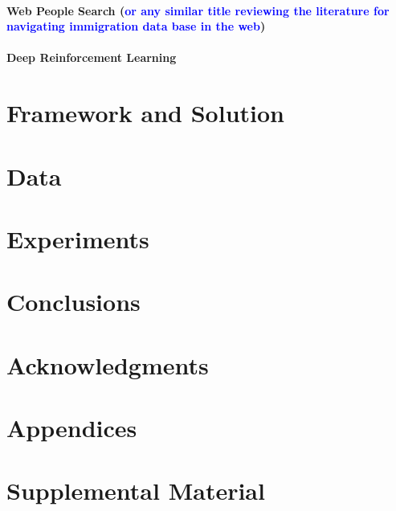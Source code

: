 \documentclass[11pt,a4paper]{article}
\newcommand{\PA}[1]{{\textcolor{blue}{#1}}}
\begin{document}
\paragraph{Web People Search (\PA{or any similar title reviewing the literature for navigating immigration data base in the web})}

\paragraph{Deep Reinforcement Learning}


\section{Framework and Solution}


\section{Data}


\section{Experiments}

\section{Conclusions}

\section*{Acknowledgments}




\appendix

\section{Appendices}
\label{sec:appendix}


\section{Supplemental Material}
\label{sec:supplemental}
\end{document}
